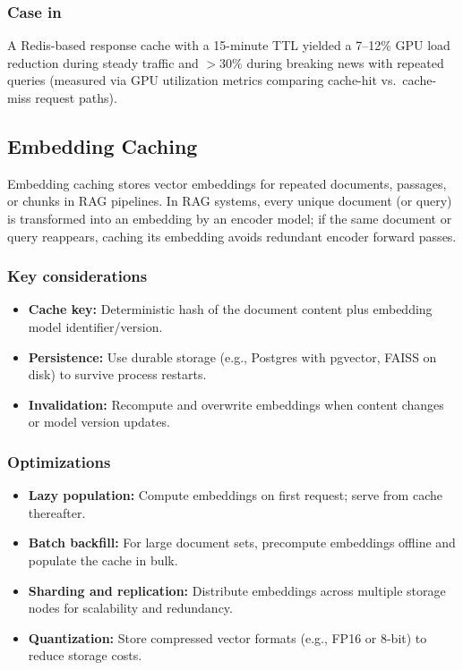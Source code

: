 \subsubsection{Case in \ishtar{}}
A Redis-based response cache with a 15-minute TTL yielded a 7--12\% GPU load reduction during steady traffic and $>\!30\%$ during breaking news with repeated queries (measured via GPU utilization metrics comparing cache-hit vs.\ cache-miss request paths).

\subsection{Embedding Caching}
\label{sec:scaling-embedding-caching}
Embedding caching stores vector embeddings for repeated documents, passages, or chunks in \textsc{RAG} pipelines. In RAG systems, every unique document (or query) is transformed into an embedding by an encoder model; if the same document or query reappears, caching its embedding avoids redundant encoder forward passes.

\subsubsection{Key considerations}
\begin{itemize}
    \item \textbf{Cache key:} Deterministic hash of the document content plus embedding model identifier/version.
    \item \textbf{Persistence:} Use durable storage (e.g., Postgres with pgvector, FAISS on disk) to survive process restarts.
    \item \textbf{Invalidation:} Recompute and overwrite embeddings when content changes or model version updates.
\end{itemize}

\subsubsection{Optimizations}
\begin{itemize}
    \item \textbf{Lazy population:} Compute embeddings on first request; serve from cache thereafter.
    \item \textbf{Batch backfill:} For large document sets, precompute embeddings offline and populate the cache in bulk.
    \item \textbf{Sharding and replication:} Distribute embeddings across multiple storage nodes for scalability and redundancy.
    \item \textbf{Quantization:} Store compressed vector formats (e.g., FP16 or 8-bit) to reduce storage costs.
\end{itemize}

